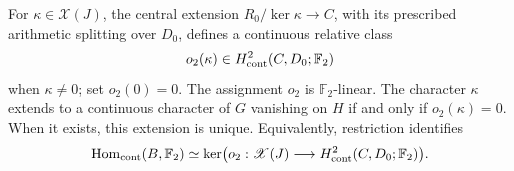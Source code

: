 \begin{theorem}\label{thm:all-cm-central-extension}
For \(\kappa\in\mathscr X(J)\), the central extension
\(R_0/\ker\kappa\to C\), with its prescribed arithmetic
splitting over \(D_0\), defines a continuous relative class
\[
                         o_2(\kappa)\in
                                H^2_{\rm cont}(C,D_0;\mathbb F_2)
\]
when \(\kappa\ne0\); set \(o_2(0)=0\).
The assignment \(o_2\) is \(\mathbb F_2\)-linear.
The character \(\kappa\) extends to a continuous character
of \(G\) vanishing on \(H\) if and only if \(o_2(\kappa)=0\).
When it exists, this extension is unique.
Equivalently, restriction identifies
\begin{equation}
 \operatorname{Hom}_{\rm cont}(B,\mathbb F_2)
   \simeq
 \ker\bigl(o_2:\mathscr X(J)\longrightarrow
                       H^2_{\rm cont}(C,D_0;\mathbb F_2)\bigr).
 \label{eq:all-cm-central-kernel-identification}
\end{equation}
\end{theorem}

